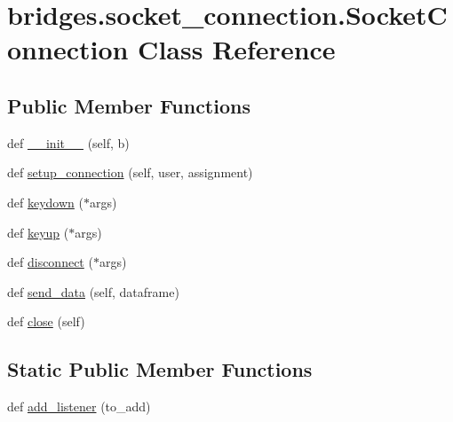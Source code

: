 \hypertarget{classbridges_1_1socket__connection_1_1_socket_connection}{}\section{bridges.\+socket\+\_\+connection.\+Socket\+Connection Class Reference}
\label{classbridges_1_1socket__connection_1_1_socket_connection}
\subsection*{Public Member Functions}
\begin{DoxyCompactItemize}
\item 
def \mbox{\hyperlink{classbridges_1_1socket__connection_1_1_socket_connection_ae241a5233f4cb8ad07e9a716ebfa3e55}{\+\_\+\+\_\+init\+\_\+\+\_\+}} (self, b)
\item 
def \mbox{\hyperlink{classbridges_1_1socket__connection_1_1_socket_connection_a346d70ef1084f4387df0f3027ac0f527}{setup\+\_\+connection}} (self, user, assignment)
\item 
def \mbox{\hyperlink{classbridges_1_1socket__connection_1_1_socket_connection_a95e4c127da0f193bc52417e0a3eceaab}{keydown}} ($\ast$args)
\item 
def \mbox{\hyperlink{classbridges_1_1socket__connection_1_1_socket_connection_adb8a6073c93fa6d2c23a14b11a1fe774}{keyup}} ($\ast$args)
\item 
def \mbox{\hyperlink{classbridges_1_1socket__connection_1_1_socket_connection_a278e1783b3ccd658001bae5e9f1b6cb7}{disconnect}} ($\ast$args)
\item 
def \mbox{\hyperlink{classbridges_1_1socket__connection_1_1_socket_connection_a6f120b756e07aab0742ed42466984b31}{send\+\_\+data}} (self, dataframe)
\item 
def \mbox{\hyperlink{classbridges_1_1socket__connection_1_1_socket_connection_a38dd36c5ac674016d526e8cd2c515ac4}{close}} (self)
\end{DoxyCompactItemize}
\subsection*{Static Public Member Functions}
\begin{DoxyCompactItemize}
\item 
def \mbox{\hyperlink{classbridges_1_1socket__connection_1_1_socket_connection_a21d94eb97d7ea92e38dc8e78f1e40876}{add\+\_\+listener}} (to\+\_\+add)
\end{DoxyCompactItemize}
